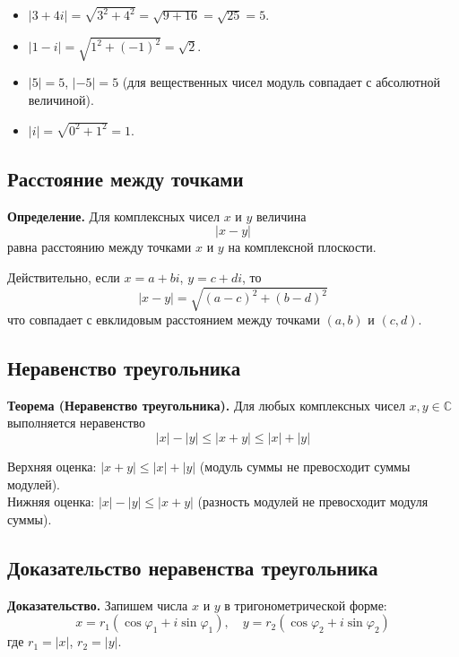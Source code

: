 \documentclass[a4paper,12pt]{article}
\theoremstyle{definition}
\theoremstyle{plain}
\theoremstyle{remark}
\begin{document}
	\begin{tcolorbox}[colback=gray!5, colframe=gray!50, title=Примеры]
		\begin{itemize}
			\item $|3 + 4i| = \sqrt{3^2 + 4^2} = \sqrt{9 + 16} = \sqrt{25} = 5$.
			\item $|1 - i| = \sqrt{1^2 + (-1)^2} = \sqrt{2}$.
			\item $|5| = 5$, $|-5| = 5$ (для вещественных чисел модуль совпадает с абсолютной величиной).
			\item $|i| = \sqrt{0^2 + 1^2} = 1$.
		\end{itemize}
	\end{tcolorbox}
	
	\subsection{Расстояние между точками}
	
	\noindent \textbf{Определение.}
	Для комплексных чисел $x$ и $y$ величина
	\[
	|x - y|
	\]
	равна расстоянию между точками $x$ и $y$ на комплексной плоскости.
	
	Действительно, если $x = a + bi$, $y = c + di$, то
	\[
	|x - y| = \sqrt{(a-c)^2 + (b-d)^2}
	\]
	что совпадает с евклидовым расстоянием между точками $(a,b)$ и $(c,d)$.
	
	\subsection{Неравенство треугольника}
	
	\noindent \textbf{Теорема (Неравенство треугольника).}
	Для любых комплексных чисел $x, y \in \mathbb{C}$ выполняется неравенство
	\[
	|x| - |y| \leq |x + y| \leq |x| + |y|
	\]
	
	\begin{tcolorbox}[colback=red!5, colframe=red!70!black, title=Неравенство треугольника в двух формах]
		Верхняя оценка: $|x + y| \leq |x| + |y|$ (модуль суммы не превосходит суммы модулей).\\
		Нижняя оценка: $|x| - |y| \leq |x + y|$ (разность модулей не превосходит модуля суммы).
	\end{tcolorbox}
	
	\subsection{Доказательство неравенства треугольника}
	
	\noindent \textbf{Доказательство.}
	Запишем числа $x$ и $y$ в тригонометрической форме:
	\[
	x = r_1(\cos \varphi_1 + i \sin \varphi_1),\quad y = r_2(\cos \varphi_2 + i \sin \varphi_2)
	\]
	где $r_1 = |x|$, $r_2 = |y|$.
	
\end{document}
